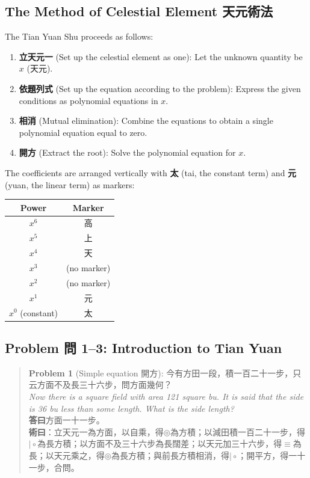 \documentclass[11pt,a4paper]{article}
\newenvironment{vol3problembox}{%
  \begin{quote}
  \itshape
  \color{vol3color}
}{%
  \end{quote}
}
\begin{document}
\subsection{The Method of Celestial Element 天元術法}

The Tian Yuan Shu proceeds as follows:

\begin{enumerate}
  \item \textbf{立天元一} (Set up the celestial element as one): Let the unknown quantity be $x$ (天元).
  \item \textbf{依題列式} (Set up the equation according to the problem): Express the given conditions as polynomial equations in $x$.
  \item \textbf{相消} (Mutual elimination): Combine the equations to obtain a single polynomial equation equal to zero.
  \item \textbf{開方} (Extract the root): Solve the polynomial equation for $x$.
\end{enumerate}

The coefficients are arranged vertically with \textbf{太} (tai, the constant term) and \textbf{元} (yuan, the linear term) as markers:

\begin{center}
\begin{tabular}{c|c}
\textbf{Power} & \textbf{Marker} \\
\hline
$x^6$ & 高 \\
$x^5$ & 上 \\
$x^4$ & 天 \\
$x^3$ & (no marker) \\
$x^2$ & (no marker) \\
$x^1$ & 元 \\
$x^0$ (constant) & 太 \\
\end{tabular}
\end{center}

\subsection{Problem 問 1--3: Introduction to Tian Yuan}

\begin{vol3problembox}
\textbf{Problem 1} (Simple equation 開方): 今有方田一段，積一百二十一步，只云方面不及長三十六步，問方面幾何？\\[0.2cm]
\textit{Now there is a square field with area 121 square bu. It is said that the side is 36 bu less than some length. What is the side length?}\\[0.2cm]
\textbf{答曰}方面一十一步。\\[0.2cm]
\textbf{術曰}：立天元一為方面，以自乘，得$\circledcirc$為方積；以減田積一百二十一步，得$\mid\circ$為長方積；以方面不及三十六步為長闊差；以天元加三十六步，得$\equiv$為長；以天元乘之，得$\circledcirc$為長方積；與前長方積相消，得$\mid\circ$；開平方，得一十一步，合問。
\end{vol3problembox}
\end{document}
